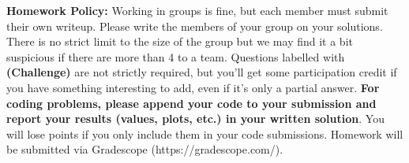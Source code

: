 \documentclass{abernethy_hw}
\begin{document}
\maketitle
\textbf{Homework Policy:} Working in groups is fine, but each member must submit their own writeup. Please write the members of your group on your solutions. There is no strict limit to the size of the group but we may find it a bit suspicious if there are more than 4 to a team. Questions labelled with \textbf{(Challenge)} are not strictly required, but you'll get some participation credit if you have something interesting to add, even if it's only a partial answer. \textbf{For coding problems, please append your code to your submission and report your results (values, plots, etc.) in your written solution}. You will lose points if you only include them in your code submissions. Homework will be submitted via Gradescope (https://gradescope.com/).
\end{document}
